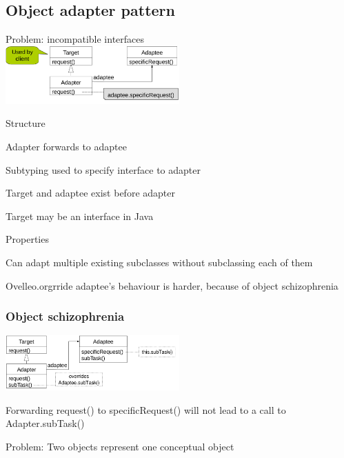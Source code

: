 \subsection{Object adapter pattern}
\enumstart
	\item Problem: incompatible interfaces
	\\ \includegraphics[width=0.5\textwidth]{img/object_adapter_pattern.png}
	\item Structure
	\enumstart
		\item Adapter forwards to adaptee
		\item Subtyping used to specify interface to adapter
		\item Target and adaptee exist before adapter
		\item Target may be an interface in Java
	\enumend
	\item Properties
	\enumstart
		\item Can adapt multiple existing subclasses without subclassing each of them
		 \item Ovelleo.orgrride adaptee's behaviour is harder, because of object schizophrenia
	\enumend
\enumend

\subsubsection{Object schizophrenia}
\includegraphics[width=0.5\textwidth]{img/object_schizophrenia.png}
\enumstart
	\item Forwarding request() to specificRequest() will not lead to a call to Adapter.subTask()
	\item Problem: Two objects represent one conceptual object
\enumend

